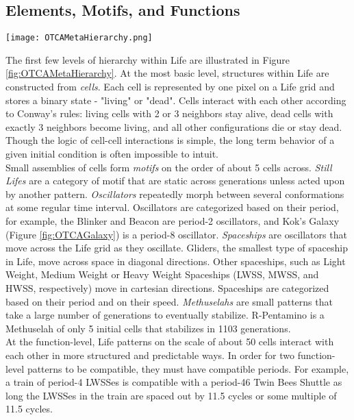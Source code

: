 {\subsection{Elements, Motifs, and Functions}

\begin{sidewaysfigure}
  \texttt{[image: OTCAMetaHierarchy.png]}
  \caption{Hierarchical breakdown of OTCA Metapixel.}
  \label{fig:OTCAMetaHierarchy}
\end{sidewaysfigure}

The first few levels of hierarchy within Life are illustrated in Figure \ref{fig:OTCAMetaHierarchy}.  At the most basic level, structures within Life are constructed from \textit{cells}.  Each cell is represented by one pixel on a Life grid and stores a binary state - "living" or "dead".  Cells interact with each other according to Conway's rules: living cells with 2 or 3 neighbors stay alive, dead cells with exactly 3 neighbors become living, and all other configurations die or stay dead.  Though the logic of cell-cell interactions is simple, the long term behavior of a given initial condition is often impossible to intuit. \\

Small assemblies of cells form \textit{motifs} on the order of about 5 cells across.  \textit{Still Lifes} are a category of motif that are static across generations unless acted upon by another pattern.  \textit{Oscillators} repeatedly morph between several conformations at some regular time interval.  Oscillators are categorized based on their period, for example, the Blinker and Beacon are period-2 oscillators, and Kok's Galaxy (Figure \ref{fig:OTCAGalaxy}) is a period-8 oscillator.  \textit{Spaceships} are oscillators that move across the Life grid as they oscillate.  Gliders, the smallest type of spaceship in Life, move across space in diagonal directions.  Other spaceships, such as Light Weight, Medium Weight or Heavy Weight Spaceships (LWSS, MWSS, and HWSS, respectively) move in cartesian directions.  Spaceships are categorized based on their period and on their speed.  \textit{Methuselahs} are small patterns that take a large number of generations to eventually stabilize.  R-Pentamino is a Methuselah of only 5 initial cells that stabilizes in 1103 generations.\\

At the function-level, Life patterns on the scale of about 50 cells interact with each other in more structured and predictable ways.  In order for two function-level patterns to be compatible, they must have compatible periods.  For example, a train of period-4 LWSSes is compatible with a period-46 Twin Bees Shuttle as long the LWSSes in the train are spaced out by 11.5 cycles or some multiple of 11.5 cycles.\\

}
